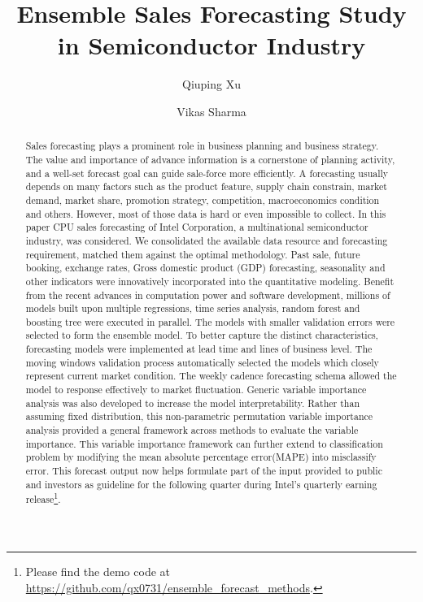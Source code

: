\documentclass{llncs}
\begin{document}

\title{Ensemble Sales Forecasting Study in Semiconductor Industry} 
\author{Qiuping Xu \and Vikas Sharma}

\maketitle



\begin{abstract} 
Sales forecasting plays a prominent role in business planning and business strategy. The value and importance of advance information is a cornerstone of planning activity, and a well-set forecast goal can guide sale-force more efficiently. A forecasting usually depends on many factors such as the product feature, supply chain constrain, market demand, market share, promotion strategy, competition, macroeconomics condition and others. However, most of those data is hard or even impossible to collect. In this paper CPU sales forecasting of Intel Corporation, a multinational semiconductor industry, was considered. We consolidated the available data resource and forecasting requirement, matched them against the optimal methodology. Past sale, future booking, exchange rates, Gross domestic product (GDP) forecasting, seasonality and other indicators were innovatively incorporated into the quantitative modeling. Benefit from the recent advances in computation power and software development, millions of models built upon multiple regressions, time series analysis, random forest and boosting tree were executed in parallel. The models with smaller validation errors were selected to form the ensemble model. To better capture the distinct characteristics, forecasting models were implemented at lead time and lines of business level. The moving windows validation process automatically selected the models which closely represent current market condition. The weekly cadence forecasting schema allowed the model to response effectively to market fluctuation. Generic variable importance analysis was also developed to increase the model interpretability. Rather than assuming fixed distribution, this non-parametric permutation variable importance analysis provided a general framework across methods to evaluate the variable importance. This variable importance framework can further extend to classification problem by modifying the mean absolute percentage error(MAPE) into misclassify error. This forecast output now helps formulate part of the input provided to public and investors as guideline for the following quarter during Intel's quarterly earning release\footnote{Please find the demo code at \\\url{https://github.com/qx0731/ensemble_forecast_methods}.}. 

\end{abstract}
\end{document}
